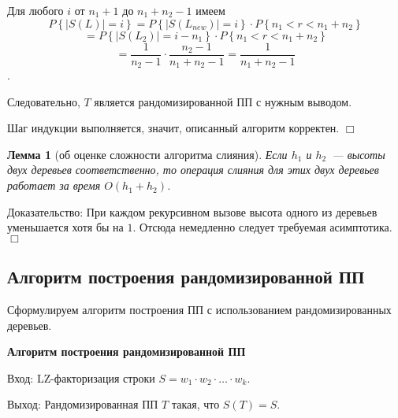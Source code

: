 \documentclass[14pt]{article}
\newtheorem{lemma}{Лемма}[section]
\begin{document}
Для любого $i$ от $n_1+1$ до $n_1+n_2-1$ имеем 
$$P\left\{\left|S(L)\right| = i\right\} = P\left\{\left|S(L_{new})\right| = i\right\} \cdot P\left\{n_1 < r < n_1+n_2\right\}$$
$$ = P\left\{\left|S(L_2)\right| = i - n_1\right\} \cdot P\left\{n_1 < r < n_1+n_2\right\}$$
$$ = \dfrac{1}{n_2-1}\cdot\dfrac{n_2-1}{n_1+n_2-1} = \dfrac{1}{n_1+n_2-1}$$.

Следовательно, $T$ является рандомизированной ПП с нужным выводом.

Шаг индукции выполняется, значит, описанный алгоритм корректен. $\Box$

\begin{lemma}[об оценке сложности алгоритма слияния]
	Если $h_1$ и $h_2$~--- высоты двух деревьев соответственно, то
	операция слияния для этих двух деревьев работает за время $O(h_1 + h_2)$. 
\end{lemma}

{\sc Доказательство:} При каждом рекурсивном вызове высота одного из деревьев
уменьшается хотя бы на $1$. Отсюда немедленно следует требуемая асимптотика. $\Box$

\subsection{Алгоритм построения рандомизированной ПП}

Сформулируем алгоритм построения ПП с использованием рандомизированных деревьев.

{\bf Алгоритм построения рандомизированной ПП}

{\sc Вход:} LZ-факторизация строки $S=w_1 \cdot w_2 \cdot \ldots \cdot w_k$.

{\sc Выход:} Рандомизированная ПП $T$ такая, что $S(T)=S$.
\end{document}

